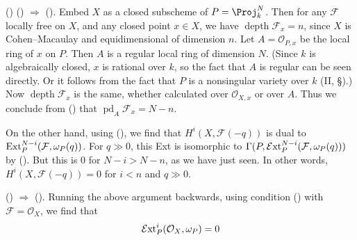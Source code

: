 {() () $\Rightarrow$ (). Embed $X$ as a closed subscheme of $P=\Proj_k^N$. Then for any $\mathcal F$ locally free \EditionText{}on $X$, and any closed point $x\in X$\EditionText{}, we have $\operatorname{depth}\mathcal F_x=n$, since $X$ is Cohen--Macaulay and equidimensional of dimension $n$. Let $A=\mathcal O_{P,x}$ be the local ring of $x$ on $P$. Then $A$ is a regular local ring of dimension $N$. (Since $k$ is algebraically closed, $x$ is rational over $k$, so the fact that $A$ is regular can be seen directly. Or it follows from the fact that $P$ is a nonsingular variety over $k$ (II, \S{}).) Now $\operatorname{depth}\mathcal F_x$ is the same, whether calculated over $\mathcal O_{X,x}$ or over $A$. Thus we conclude from () that $\operatorname{pd}_A\mathcal F_x=N-n$.

On the other hand, using (), we find that $H^i(X,\mathcal F(-q))$ is dual to $\operatorname{Ext}_P^{N-i}(\mathcal F,\omega_P(q))$. For $q\gg0$, this Ext is isomorphic to $\Gamma(P,\operatorname{\mathcal E xt}_P^{N-i}(\mathcal F,\omega_P(q)))$ by (). But this is $0$ for $N-i>N-n$, as we have just seen. In other words, $H^i(X,\mathcal F(-q))=0$ for $i<n$ and $q\gg0$.

() $\Rightarrow$ (). Running the above argument backwards, using condition () with $\mathcal F=\mathcal O_X$, we find that
\[
\operatorname{\mathcal E xt}_P^i(\mathcal O_X,\omega_P)=0
\]
}
